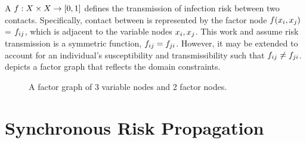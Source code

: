 A  $\vFactor: \vVariables \times \vVariables \rightarrow [0, 1]$ defines the transmission of infection risk between two contacts. Specifically, contact between  is represented by the factor node $\vFactor(\vVariable[i], \vVariable[j])$ = $\vFactor[ij]$, which is adjacent to the variable nodes $\vVariable[i], \vVariable[j]$. This work and \citet{Ayday2021} assume risk transmission is a symmetric function, $\vFactor[ij] = \vFactor[ji]$. However, it may be extended to account for an individual's susceptibility and transmissibility such that $\vFactor[ij] \neq \vFactor[ji]$.  depicts a factor graph that reflects the domain constraints.

\begin{figure}[htb]
\centering
{}
\caption[Factor graph]{A factor graph of 3 variable nodes and 2 factor nodes.}
\label{fig:factor-graph}
\end{figure}

\section{Synchronous Risk Propagation}\label{sec:synchronous}

\newcommand{\pDiff}{\epsilon}
\newcommand{\topK}[1]{\text{top } K \text{ of } #1}
\newcommand{\vRiskScores}[2]{\vSet{R}_{#1}^{(#2)}}
\newcommand{\vExposureScore}[2]{r_{#1}^{(#2)}}
\newcommand{\vExposureScores}[1]{\mathbf{r}^{(#1)}}
\newcommand{\dist}{d}

